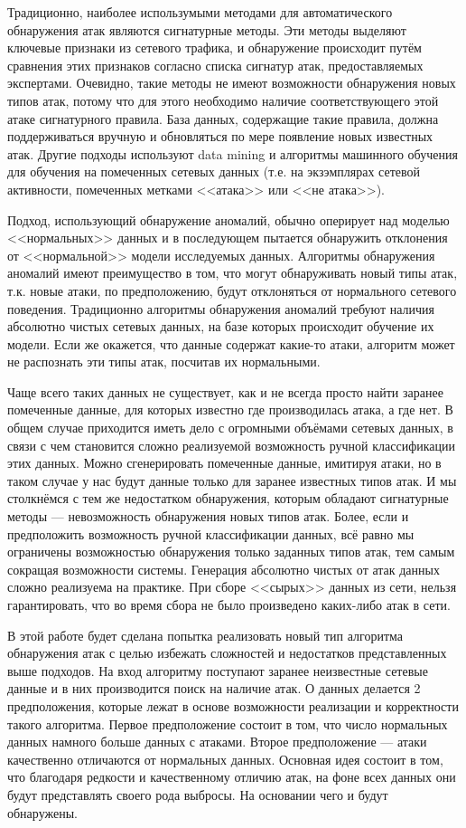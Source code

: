 Традиционно, наиболее использумыми методами для автоматического обнаружения атак являются сигнатурные методы. Эти методы выделяют ключевые признаки из сетевого трафика, и обнаружение происходит путём сравнения этих признаков согласно списка сигнатур атак, предоставляемых экспертами. Очевидно, такие методы не имеют возможности обнаружения новых типов атак, потому что для этого необходимо наличие соответствующего этой атаке сигнатурного правила. База данных, содержащие такие правила, должна поддерживаться вручную и обновляться по мере появление новых известных атак. Другие подходы используют data mining и алгоритмы машинного обучения для обучения на помеченных сетевых данных (т.е. на экзэмплярах сетевой активности, помеченных метками <<атака>> или <<не атака>>).

Подход, использующий обнаружение аномалий, обычно оперирует над моделью <<нормальных>> данных и в последующем пытается обнаружить отклонения от <<нормальной>> модели исследуемых данных. Алгоритмы обнаружения аномалий имеют преимущество в том, что могут обнаруживать новый типы атак, т.к. новые атаки, по предположению, будут отклоняться от нормального сетевого поведения. Традиционно алгоритмы обнаружения аномалий требуют наличия абсолютно чистых сетевых данных, на базе которых происходит обучение их модели. Если же окажется, что данные содержат какие-то атаки, алгоритм может не распознать эти типы атак, посчитав их нормальными.

Чаще всего таких данных не существует, как и не всегда просто найти заранее помеченные данные, для которых известно где производилась атака, а где нет. В общем случае приходится иметь дело с огромными объёмами сетевых данных, в связи с чем становится сложно реализуемой возможность ручной классификации этих данных. Можно сгенерировать помеченные данные, имитируя атаки, но в таком случае у нас будут данные только для заранее известных типов атак. И мы столкнёмся с тем же недостатком обнаружения, которым обладают сигнатурные методы --- невозможность обнаружения новых типов атак. Более, если и предположить возможность ручной классификации данных, всё равно мы ограничены возможностью обнаружения только заданных типов атак, тем самым сокращая возможности системы. Генерация абсолютно чистых от атак данных сложно реализуема на практике. При сборе <<сырых>> данных из сети, нельзя гарантировать, что во время сбора не было произведено каких-либо атак в сети.

В этой работе будет сделана попытка реализовать новый тип алгоритма обнаружения атак с целью избежать сложностей и недостатков представленных выше подходов. На вход алгоритму поступают заранее неизвестные сетевые данные и в них производится поиск на наличие атак. О данных делается 2 предположения, которые лежат в основе возможности реализации и корректности такого алгоритма. Первое предположение состоит в том, что число нормальных данных намного больше данных с атаками. Второе предположение --- атаки качественно отличаются от нормальных данных. Основная идея состоит в том, что благодаря редкости и качественному отличию атак, на фоне всех данных они будут представлять своего рода выбросы. На основании чего и будут обнаружены. 